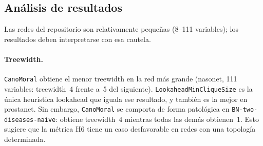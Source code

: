 \documentclass[11pt, a4paper]{article}
\begin{document}
\begin{table}[!htbp]
\centering
\renewcommand{\arraystretch}{1.15}
\caption{Suma del árbol de unión (producto de cardinalidades de cada clique
         sumado sobre todos los cliques). Mide el coste real de la inferencia.
         Valores en miles (K) o millones (M) cuando corresponde.
         En negrita el mejor resultado de cada fila.}
\label{tab:sum}
\end{table}

\subsection{Análisis de resultados}

Las redes del repositorio son relativamente pequeñas (8--111 variables); los resultados deben interpretarse con esa cautela.

\paragraph{Treewidth.}
\texttt{CanoMoral} obtiene el menor treewidth en la red más grande (nasonet, 111 variables: treewidth~4 frente a~5 del siguiente). \texttt{LookaheadMinCliqueSize} es la única heurística lookahead que iguala ese resultado, y también es la mejor en prostanet. Sin embargo, \texttt{CanoMoral} se comporta de forma patológica en \texttt{BN-two-diseases-naive}: obtiene treewidth~4 mientras todas las demás obtienen~1. Esto sugiere que la métrica H6 tiene un caso desfavorable en redes con una topología determinada.
\end{document}
